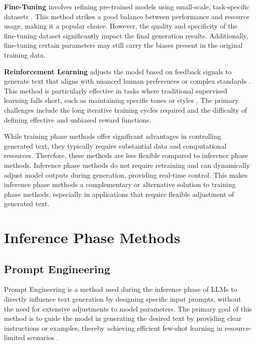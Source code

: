 \documentclass[acmsmall, screen]{acmart}
\begin{document}
\textbf{Fine-Tuning} involves refining pre-trained models using small-scale, task-specific datasets \cite{zeldes_arxiv20_AuxiliaryTuning,zhang_emnlp22_discup,zhang_acl24_RMT,wei_iclr22_FLAN,zhou_icml23_InstructCTG,zheng_aacl23_REI}. This method strikes a good balance between performance and resource usage, making it a popular choice. However, the quality and specificity of the fine-tuning dataset significantly impact the final generation results. Additionally, fine-tuning certain parameters may still carry the biases present in the original training data.

\textbf{Reinforcement Learning} adjusts the model based on feedback signals to generate text that aligns with nuanced human preferences or complex standards \cite{khalifa_iclr21_GDC,stiennon_neurips20_RLHF,ouyang_neurips22_InstructGPT,dai_iclr24_SafeRLHF}. This method is particularly effective in tasks where traditional supervised learning falls short, such as maintaining specific tones or styles \cite{upadhyay_arxiv22_DRL,zeng_arxiv24_TDPO}. The primary challenges include the long iterative training cycles required and the difficulty of defining effective and unbiased reward functions.

While training phase methods offer significant advantages in controlling generated text, they typically require substantial data and computational resources. Therefore, these methods are less flexible compared to inference phase methods. Inference phase methods do not require retraining and can dynamically adjust model outputs during generation, providing real-time control. This makes inference phase methods a complementary or alternative solution to training phase methods, especially in applications that require flexible adjustment of generated text.

\section{Inference Phase Methods}
\label{sec:infer_methods}

\subsection{Prompt Engineering}
Prompt Engineering is a method used during the inference phase of LLMs to directly influence text generation by designing specific input prompts, without the need for extensive adjustments to model parameters. The primary goal of this method is to guide the model in generating the desired text by providing clear instructions or examples, thereby achieving efficient few-shot learning in resource-limited scenarios \cite{wan_arxiv23_promptSurvey}.
\end{document}
